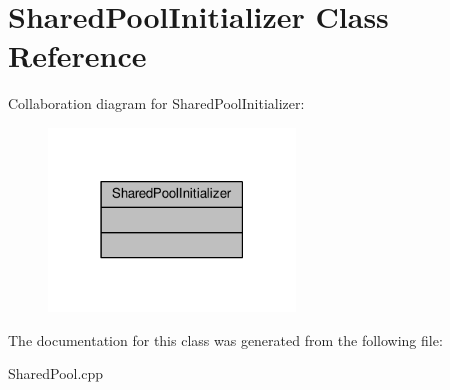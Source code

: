 \hypertarget{classSharedPoolInitializer}{}\section{Shared\+Pool\+Initializer Class Reference}
\label{classSharedPoolInitializer}


Collaboration diagram for Shared\+Pool\+Initializer\+:
\nopagebreak
\begin{figure}[H]
\begin{center}
\leavevmode
\includegraphics[width=186pt]{d9/d67/classSharedPoolInitializer__coll__graph}
\end{center}
\end{figure}


The documentation for this class was generated from the following file\+:\begin{DoxyCompactItemize}
\item 
Shared\+Pool.\+cpp\end{DoxyCompactItemize}
